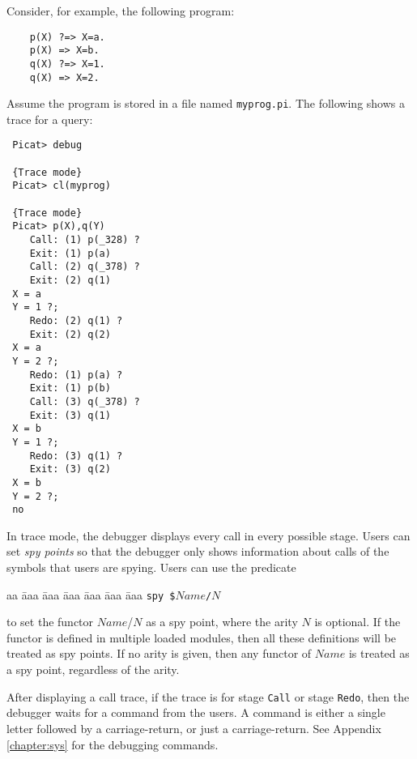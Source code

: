 Consider, for example, the following program:
\begin{verbatim}
    p(X) ?=> X=a.
    p(X) => X=b.
    q(X) ?=> X=1.
    q(X) => X=2.
\end{verbatim}
Assume the program is stored in a file named \texttt{myprog.pi}. The following shows a trace for a query:
\begin{verbatim}
 Picat> debug

 {Trace mode}
 Picat> cl(myprog)

 {Trace mode}
 Picat> p(X),q(Y)  
    Call: (1) p(_328) ?
    Exit: (1) p(a) 
    Call: (2) q(_378) ?
    Exit: (2) q(1) 
 X = a
 Y = 1 ?;
    Redo: (2) q(1) ?
    Exit: (2) q(2) 
 X = a
 Y = 2 ?;
    Redo: (1) p(a) ?
    Exit: (1) p(b) 
    Call: (3) q(_378) ?
    Exit: (3) q(1) 
 X = b
 Y = 1 ?;
    Redo: (3) q(1) ?
    Exit: (3) q(2) 
 X = b
 Y = 2 ?;
 no
\end{verbatim}

In trace mode, the debugger displays every call in every possible stage. Users can set \emph{spy points} so that the debugger only shows information about calls of the symbols that users are spying. Users can use the predicate 
\begin{tabbing}
aa \= aaa \= aaa \= aaa \= aaa \= aaa \= aaa \kill
\> \texttt{spy \$$Name$/$N$} 
\end{tabbing}
to set the functor $Name$/$N$ as a spy point, where the arity $N$ is optional. If the functor is defined in multiple loaded modules, then all these definitions will be treated as spy points. If no arity is given, then any functor of $Name$ is treated as a spy point, regardless of the arity.

After displaying a call trace, if the trace is for stage \texttt{Call} or stage \texttt{Redo}, then the debugger waits for a command from the users. A command is either a single letter followed by a carriage-return, or just a carriage-return. See Appendix \ref{chapter:sys} for the debugging commands.



